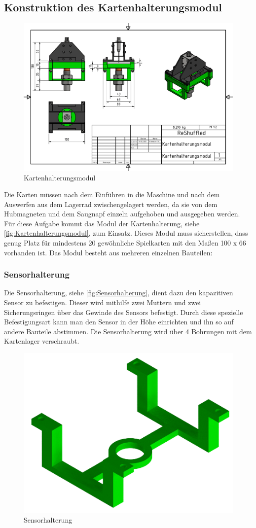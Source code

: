 \subsection{Konstruktion des Kartenhalterungsmodul}
\begin{figure}[H]
    \centering
    \includegraphics[width=7 cm]{fig/mech/Kartenhalterungsmodul}
    \caption{Kartenhalterungsmodul}
    \label{fig:Kartenhalterungsmodul}
\end{figure}
Die Karten müssen nach dem Einführen in die Maschine und nach dem Auswerfen aus dem Lagerrad zwischengelagert werden, da sie
von dem Hubmagneten und dem Saugnapf einzeln aufgehoben und ausgegeben werden. Für diese Aufgabe kommt das Modul der
Kartenhalterung, siehe \autoref{fig:Kartenhalterungsmodul}, zum Einsatz. Dieses Modul muss sicherstellen, dass genug Platz für mindestens 20 gewöhnliche Spielkarten  mit den Maßen 100 x 66
vorhanden ist. Das Modul besteht aus mehreren einzelnen Bauteilen:



\subsubsection{Sensorhalterung}

Die Sensorhalterung, siehe \autoref{fig:Sensorhalterung}, dient dazu den kapazitiven Sensor zu befestigen. Dieser wird mithilfe zwei Muttern und zwei Sicherungsringen
über das Gewinde des Sensors befestigt. Durch diese spezielle Befestigungsart kann man den Sensor in der Höhe einrichten und ihn so
auf andere Bauteile abstimmen. Die Sensorhalterung wird über 4 Bohrungen mit dem Kartenlager verschraubt.
\begin{figure}[H]
    \centering
    \includegraphics[width=8 cm]{fig/mech/SensorhalterungNeu.png}
    \caption{Sensorhalterung}
    \label{fig:Sensorhalterung}
\end{figure}


